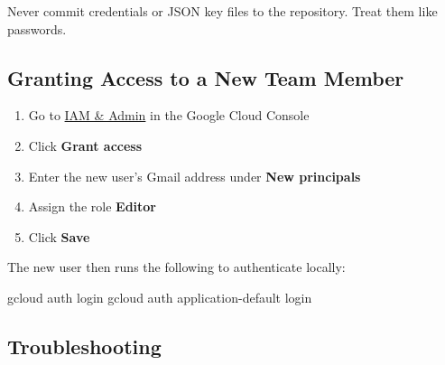 \documentclass[
  letterpaper,
  DIV=11,
  numbers=noendperiod]{scrreprt}
\newenvironment{Shaded}{\begin{snugshade}}{\end{snugshade}}
\newcommand{\ExtensionTok}[1]{\textcolor[rgb]{0.00,0.23,0.31}{#1}}
\newcommand{\NormalTok}[1]{\textcolor[rgb]{0.00,0.23,0.31}{#1}}
\providecommand{\tightlist}{%
  \setlength{\itemsep}{0pt}\setlength{\parskip}{0pt}}
\begin{document}
\begin{tcolorbox}[enhanced jigsaw, arc=.35mm, bottomrule=.15mm, bottomtitle=1mm, breakable, colback=white, colbacktitle=quarto-callout-warning-color!10!white, colframe=quarto-callout-warning-color-frame, coltitle=black, left=2mm, leftrule=.75mm, opacityback=0, opacitybacktitle=0.6, rightrule=.15mm, title=\textcolor{quarto-callout-warning-color}{\faExclamationTriangle}\hspace{0.5em}{Warning}, titlerule=0mm, toprule=.15mm, toptitle=1mm]

Never commit credentials or JSON key files to the repository. Treat them
like passwords.

\end{tcolorbox}

\subsection{Granting Access to a New Team
Member}\label{granting-access-to-a-new-team-member}

\begin{enumerate}
\def\labelenumi{\arabic{enumi}.}
\tightlist
\item
  Go to \href{https://console.cloud.google.com/iam-admin/}{IAM \& Admin}
  in the Google Cloud Console
\item
  Click \textbf{Grant access}
\item
  Enter the new user's Gmail address under \textbf{New principals}
\item
  Assign the role \textbf{Editor}
\item
  Click \textbf{Save}
\end{enumerate}

The new user then runs the following to authenticate locally:

\begin{Shaded}
\begin{Highlighting}[]
\ExtensionTok{gcloud}\NormalTok{ auth login}
\ExtensionTok{gcloud}\NormalTok{ auth application{-}default login}
\end{Highlighting}
\end{Shaded}

\subsection{Troubleshooting}\label{troubleshooting}
\end{document}
